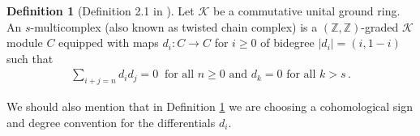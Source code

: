 \documentclass[dvipsnames]{amsart}
\theoremstyle{definition}
\newtheorem{definition}[theorem]{Definition}
\theoremstyle{definition}
\numberwithin{equation}{section}
\newcommand{\Z}{\mathbb{Z}}
\begin{document}
\begin{definition}[Definition 2.1 in \cite{livernet2020spectral}] \label{def: truncated multicomplex}Let $\mathcal{K}$ be a commutative unital ground ring. An $s$-multicomplex (also known as twisted chain complex) is a $(\Z,\Z)$-graded $\mathcal{K}$ module $C$ equipped with maps $d_i\colon C\to C$ for $i\ge 0$ of bidegree $|d_i|=(i,1-i)$ such that
\begin{align}\label{eq: multicomplex maps rules}
    \sum_{i+j=n}d_id_j=0\ \text{ for all }n\ge 0\text{ and }d_k=0\text{ for all }k>s\,.
\end{align}
\end{definition}
We should also mention that in Definition \ref{def: truncated multicomplex} we are choosing a cohomological sign and degree convention for the differentials $d_i$.
\end{document}

